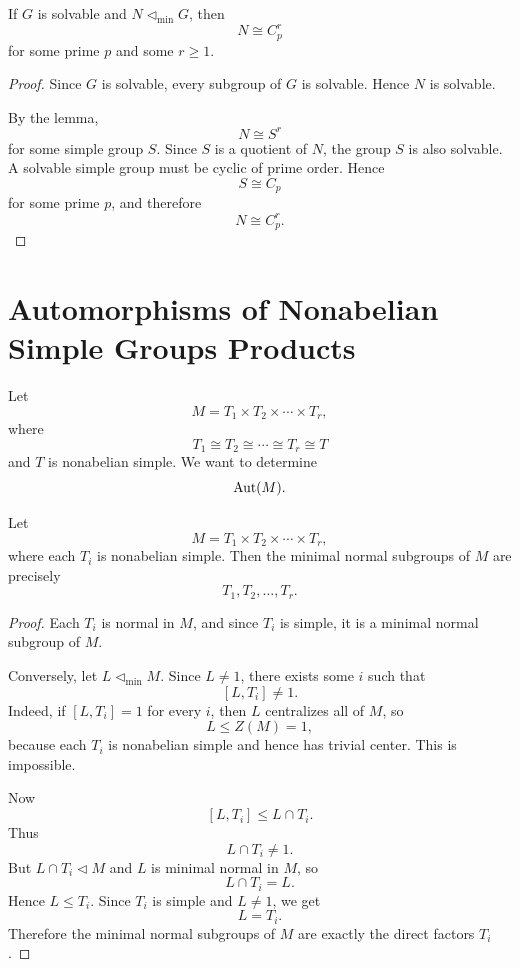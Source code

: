 \begin{corollary}
If $G$ is solvable and $N\lhd_{\mathrm{min}}G$, then
\[
    N\cong C_p^r
\]
for some prime $p$ and some $r\geq1$.
\end{corollary}

\begin{proof}
Since $G$ is solvable, every subgroup of $G$ is solvable. Hence $N$ is solvable.

By the lemma,
\[
    N\cong S^r
\]
for some simple group $S$. Since $S$ is a quotient of $N$, the group $S$ is also solvable. A solvable simple group must be cyclic of prime order. Hence
\[
    S\cong C_p
\]
for some prime $p$, and therefore
\[
    N\cong C_p^r.
\]
\end{proof}

\section{Automorphisms of Nonabelian Simple Groups Products}

\begin{topic}[Question]
Let
\[
    M=T_1\times T_2\times\cdots\times T_r,
\]
where
\[
    T_1\cong T_2\cong\cdots\cong T_r\cong T
\]
and $T$ is nonabelian simple. We want to determine
\[
    \operatorname{Aut}(M).
\]
\end{topic}

\begin{lemma}
Let
\[
    M=T_1\times T_2\times\cdots\times T_r,
\]
where each $T_i$ is nonabelian simple. Then the minimal normal subgroups of $M$ are precisely
\[
    T_1,T_2,\ldots,T_r.
\]
\end{lemma}

\begin{proof}
Each $T_i$ is normal in $M$, and since $T_i$ is simple, it is a minimal normal subgroup of $M$.

Conversely, let $L\lhd_{\mathrm{min}}M$. Since $L\neq1$, there exists some $i$ such that
\[
    [L,T_i]\neq1.
\]
Indeed, if $[L,T_i]=1$ for every $i$, then $L$ centralizes all of $M$, so
\[
    L\leq Z(M)=1,
\]
because each $T_i$ is nonabelian simple and hence has trivial center. This is impossible.

Now
\[
    [L,T_i]\leq L\cap T_i.
\]
Thus
\[
    L\cap T_i\neq1.
\]
But $L\cap T_i\lhd M$ and $L$ is minimal normal in $M$, so
\[
    L\cap T_i=L.
\]
Hence $L\leq T_i$. Since $T_i$ is simple and $L\neq1$, we get
\[
    L=T_i.
\]
Therefore the minimal normal subgroups of $M$ are exactly the direct factors $T_i$.
\end{proof}

